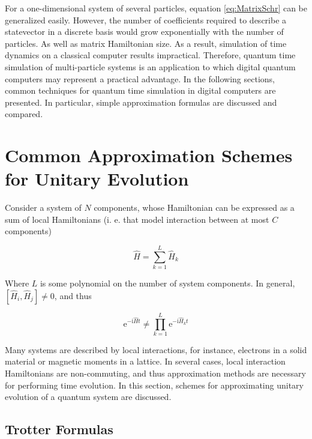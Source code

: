   For a one-dimensional system of several particles, equation \ref{eq:MatrixSchr} can be generalized easily. However, the number of coefficients required to describe a statevector in a discrete basis would grow exponentially with the number of particles. As well as matrix Hamiltonian size. As a result, simulation of time dynamics on a classical computer results impractical. Therefore, quantum time simulation of multi-particle systems is an application to which digital quantum computers may represent a practical advantage. In the following sections, common techniques for quantum time simulation in digital computers are presented. In particular, simple approximation formulas are discussed and compared. 


\section{Common Approximation Schemes for Unitary Evolution}
\label{sec:trotter}

  Consider a system of $N$ components, whose Hamiltonian can be expressed as a sum of local Hamiltonians (i. e. that model interaction between at most $C$ components) \cite{Nielsen,LloydNature}

  \begin{equation}
    \hat{H} = \sum_{k = 1}^{L} \hat{H}_k
    \label{eq:SparseHam}
  \end{equation}

  Where $L$ is some polynomial on the number of system components. In general, $[\hat{H}_i,\hat{H}_j] \neq 0$, and thus

  \begin{equation}
    \mathrm{e}^{-\mathrm{i}\hat{H}t} \neq \prod_{k = 1}^{L} \mathrm{e}^{-\mathrm{i}\hat{H}_kt}
    \label{eq:CommuteUnit}
  \end{equation}

  Many systems are described by local interactions, for instance, electrons in a solid material or magnetic moments in a lattice. In several cases, local interaction Hamiltonians are non-commuting, and thus approximation methods are necessary for performing time evolution. In this section, schemes for approximating unitary evolution of a quantum system are discussed.

  \subsection{Trotter Formulas}

